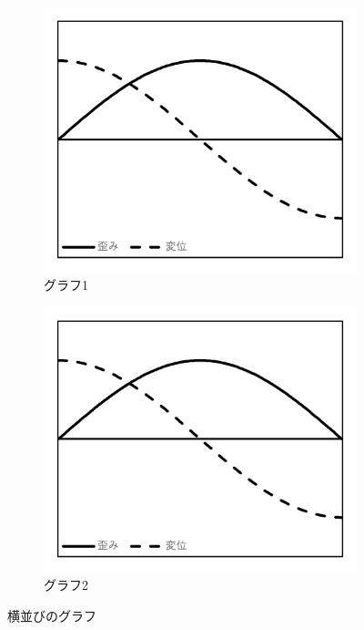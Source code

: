\documentclass[lualatex,ja=standard]{bxjsarticle}
\begin{document}
\begin{figure}[htbp]
  \centering
  \begin{subfigure}{0.48\linewidth}
    \centering
    \includegraphics[width=\linewidth]{img/BN/graph.png}
    \caption{グラフ1}
    \label{fig:example-double-graph-1}
  \end{subfigure}
  \hfill
  \begin{subfigure}{0.48\linewidth}
    \centering
    \includegraphics[width=\linewidth]{img/BN/graph.png}
    \caption{グラフ2}
    \label{fig:example-double-graph-2}
  \end{subfigure}

  \caption{横並びのグラフ}
  \label{fig:example-double-graph}
\end{figure}
\end{document}
